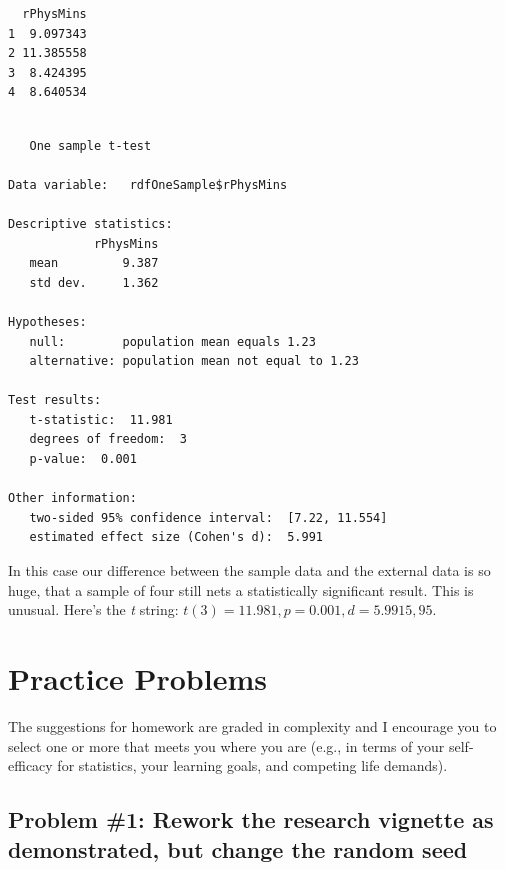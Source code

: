 \documentclass[
  11pt,
]{book}
\newenvironment{Shaded}{\begin{snugshade}}{\end{snugshade}}
\newcommand{\AttributeTok}[1]{\textcolor[rgb]{0.77,0.63,0.00}{#1}}
\newcommand{\FloatTok}[1]{\textcolor[rgb]{0.00,0.00,0.81}{#1}}
\newcommand{\FunctionTok}[1]{\textcolor[rgb]{0.00,0.00,0.00}{#1}}
\newcommand{\NormalTok}[1]{#1}
\newcommand{\SpecialCharTok}[1]{\textcolor[rgb]{0.00,0.00,0.00}{#1}}
\begin{document}
\begin{verbatim}
  rPhysMins
1  9.097343
2 11.385558
3  8.424395
4  8.640534
\end{verbatim}

\begin{Shaded}
\end{Shaded}

\begin{verbatim}

   One sample t-test 

Data variable:   rdfOneSample$rPhysMins 

Descriptive statistics: 
            rPhysMins
   mean         9.387
   std dev.     1.362

Hypotheses: 
   null:        population mean equals 1.23 
   alternative: population mean not equal to 1.23 

Test results: 
   t-statistic:  11.981 
   degrees of freedom:  3 
   p-value:  0.001 

Other information: 
   two-sided 95% confidence interval:  [7.22, 11.554] 
   estimated effect size (Cohen's d):  5.991 
\end{verbatim}

In this case our difference between the sample data and the external data is so huge, that a sample of four still nets a statistically significant result. This is unusual. Here's the \emph{t} string: \(t(3) = 11.981, p = 0.001, d = 5.9915, 95%
\).

\hypertarget{practice-problems-1}{%
\section{Practice Problems}\label{practice-problems-1}}

The suggestions for homework are graded in complexity and I encourage you to select one or more that meets you where you are (e.g., in terms of your self-efficacy for statistics, your learning goals, and competing life demands).

\hypertarget{problem-1-rework-the-research-vignette-as-demonstrated-but-change-the-random-seed}{%
\subsection{Problem \#1: Rework the research vignette as demonstrated, but change the random seed}\label{problem-1-rework-the-research-vignette-as-demonstrated-but-change-the-random-seed}}
\end{document}
